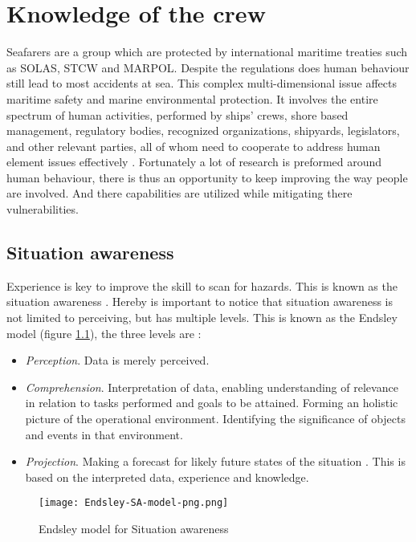 \chapter{Knowledge of the crew}
\label{sec:knowledge}
Seafarers are a group which are protected by international maritime treaties such as \ac{SOLAS}, \ac{STCW} and \ac{MARPOL}. Despite the regulations does human behaviour still lead to most accidents at sea. This complex multi-dimensional issue affects maritime safety and marine environmental protection. It involves the entire spectrum of human activities, performed by ships' crews, shore based management, regulatory bodies, recognized organizations, shipyards, legislators, and other relevant parties, all of whom need to cooperate to address human element issues effectively \cite{IMO2017}.
Fortunately a lot of research is preformed around human behaviour, there is thus an opportunity to keep improving the way people are involved. And there capabilities are utilized while mitigating there vulnerabilities.

\section{Situation awareness}
Experience is key to improve the skill to scan for hazards. This is known as the situation awareness \cite{Underwood2013}. Hereby is important to notice that situation awareness is not limited to perceiving, but has multiple levels. This is known as the Endsley model (figure \ref{fig:Endsley-SA-model}), the three levels are \cite{Kalloniatis2017}: 
\begin{itemize}
	\item \emph{Perception}. Data is merely perceived.
	\item \emph{Comprehension}. Interpretation of data, enabling understanding of relevance in relation to tasks performed and goals to be attained. Forming an holistic picture of the operational environment. Identifying the significance of objects and events in that environment.
	\item \emph{Projection}. Making a forecast for likely future states of the situation . This is based on the interpreted data, experience and knowledge.
\end{itemize}

\begin{figure}[H]
	\centering
	\texttt{[image: Endsley-SA-model-png.png]}
	\caption{Endsley model for Situation awareness}
	\label{fig:Endsley-SA-model}
\end{figure}

